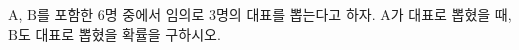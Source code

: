 $\mathrm{A}$, $\mathrm{B}$를 포함한 $6$명 중에서 임의로 $3$명의 대표를 뽑는다고 하자. $\mathrm{A}$가 대표로 뽑혔을 때, $\mathrm{B}$도 대표로 뽑혔을 확률을 구하시오.
